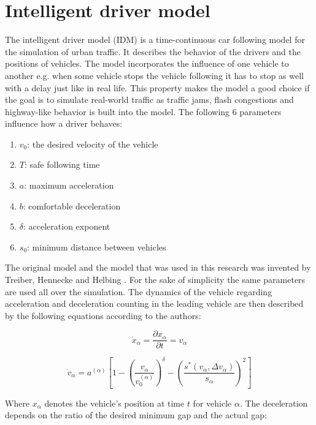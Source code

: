 \documentclass[
]{elteikthesis}[2023/04/10]
\begin{document}
\section{Intelligent driver model}

The intelligent driver model (IDM) is a time-continuous car following
model for the simulation of urban traffic. It describes the behavior
of the drivers and the positions of vehicles. The model incorporates
the influence of one vehicle to another e.g. when some vehicle stops
the vehicle following it has to stop as well with a delay just like in 
real life. This property makes the model a good choice if the goal is to 
simulate real-world traffic as traffic jams, flash congestions and highway-like
behavior is built into the model. The following 6 parameters influence
how a driver behaves:
\begin{enumerate}
\item $v_{0}$: the desired velocity of the vehicle
\item $T$: safe following time
\item $a$: maximum acceleration
\item $b$: comfortable deceleration
\item $\delta$: acceleration exponent
\item $s_{0}$: minimum distance between vehicles
\end{enumerate}
The original model and the model that was used in this research was
invented by Treiber, Hennecke and Helbing \cite{treiber2000congested}.
For the sake of simplicity the same parameters are used all over the
simulation. The dynamics of the vehicle regarding acceleration and
deceleration counting in the leading vehicle are then described by
the following equations according to the authors:

\begin{equation}
\dot{x}_{\alpha}=\frac{\partial x_{\alpha}}{\partial t}=v_{\alpha}
\end{equation}

\begin{equation}
\dot{v}_{\alpha}=a^{(\alpha)}\left[1-\left(\frac{v_{\alpha}}{v_{0}^{(\alpha)}}\right)^{\delta}-\left(\frac{s^{*}(v_{\alpha},\Delta v_{\alpha})}{s_{\alpha}}\right)^{2}\right]
\end{equation}

Where $x_{\alpha}$ denotes the vehicle's position at time $t$ for
vehicle $\alpha$. The deceleration depends on the ratio of the desired
minimum gap and the actual gap:
\end{document}
